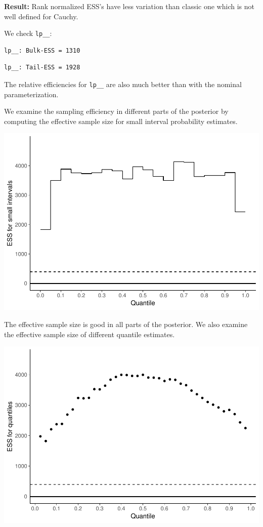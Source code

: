 \documentclass[american,]{article}
\begin{document}
\textbf{Result:} Rank normalized ESS's have less variation than classic
one which is not well defined for Cauchy.

We check \texttt{lp\_\_}:

\begin{verbatim}
lp__: Bulk-ESS = 1310
\end{verbatim}

\begin{verbatim}
lp__: Tail-ESS = 1928
\end{verbatim}

The relative efficiencies for \texttt{lp\_\_} are also much better than
with the nominal parameterization.

We examine the sampling efficiency in different parts of the posterior
by computing the effective sample size for small interval probability
estimates.

\includegraphics{graphics/local-ess-fit-alt1-2-1.pdf}

The effective sample size is good in all parts of the posterior. We also
examine the effective sample size of different quantile estimates.

\includegraphics{graphics/quantile-ess-fit-alt1-2-1.pdf}
\end{document}
